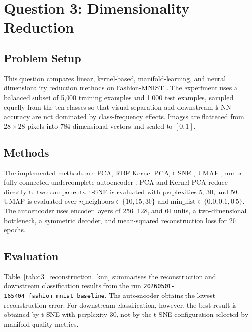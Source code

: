 \section{Question 3: Dimensionality Reduction}

\subsection{Problem Setup}

This question compares linear, kernel-based, manifold-learning, and neural dimensionality reduction methods on Fashion-MNIST \cite{xiao2017fashion}. The experiment uses a balanced subset of 5{,}000 training examples and 1{,}000 test examples, sampled equally from the ten classes so that visual separation and downstream k-NN accuracy are not dominated by class-frequency effects. Images are flattened from $28 \times 28$ pixels into 784-dimensional vectors and scaled to $[0,1]$.

\subsection{Methods}

The implemented methods are PCA, RBF Kernel PCA, t-SNE \cite{vandermaaten2008tsne}, UMAP \cite{mcinnes2018umap}, and a fully connected undercomplete autoencoder \cite{hinton2006autoencoders}. PCA and Kernel PCA reduce directly to two components. t-SNE is evaluated with perplexities 5, 30, and 50. UMAP is evaluated over $n\_\mathrm{neighbors}\in\{10,15,30\}$ and $\mathrm{min\_dist}\in\{0.0,0.1,0.5\}$. The autoencoder uses encoder layers of 256, 128, and 64 units, a two-dimensional bottleneck, a symmetric decoder, and mean-squared reconstruction loss for 20 epochs.

\subsection{Evaluation}

Table~\ref{tab:q3_reconstruction_knn} summarises the reconstruction and downstream classification results from the run \texttt{20260501-165404\_fashion\_mnist\_baseline}. The autoencoder obtains the lowest reconstruction error. For downstream classification, however, the best result is obtained by t-SNE with perplexity 30, not by the t-SNE configuration selected by manifold-quality metrics.

